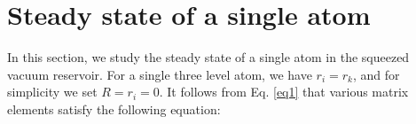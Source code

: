 \documentclass[aps,showpacs,twocolumn,twoside,groupedaddress]{revtex4}
\begin{document}
\section{Steady state of a single atom}
In this section, we study the steady state of a single atom in the squeezed vacuum reservoir. For a single three level atom, we have $r_i=r_k$, and for simplicity we set $R=r_i=0$. It follows from Eq. \eqref{eq1} that various matrix elements satisfy the following equation:
\end{document}
